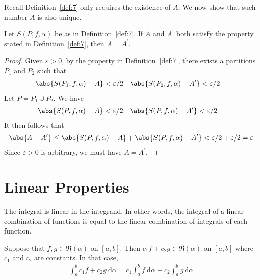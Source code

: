\documentclass[thmcnt=section, 12pt]{elegantbook}
\begin{document}

\par Recall Definition~\ref{def:7} only requires the existence of $A$. We now show that such number $A$ is also unique.

\begin{proposition} \label{pro:7}
    Let $S(P,f,\alpha)$ be as in Definition~\ref{def:7}. If $A$ and $A^\prime$ both satisfy the property stated in Definition~\ref{def:7}, then $A = A^\prime$.
\end{proposition}

\begin{proof}
    Given $\varepsilon > 0$, by the property in Definition~\ref{def:7}, there exists a partitions $P_1$ and $P_2$ such that  
    \begin{align*}
        \abs{S(P_1,f,\alpha) - A} &< \varepsilon / 2 &
        \abs{S(P_2,f,\alpha) - A^\prime} &< \varepsilon / 2
    \end{align*}
    Let $P = P_1 \cup P_2$. We have
    \begin{align*}
        \abs{S(P,f,\alpha) - A} &< \varepsilon / 2 &
        \abs{S(P,f,\alpha) - A^\prime} &< \varepsilon / 2
    \end{align*}
    It then follows that
    \begin{align*}
        \abs{A - A^\prime}
        \leq \abs{S(P,f,\alpha) - A} +
        \abs{S(P,f,\alpha) - A^\prime} 
        < \varepsilon / 2 + \varepsilon / 2
        = \varepsilon
    \end{align*}
    Since $\varepsilon > 0$ is arbitrary, we must have $A = A^\prime$.
\end{proof}


\section{Linear Properties}


\par The integral is linear in the integrand. In other words, the integral of a linear combination of functions is equal to the linear combination of integrals of each function.

\begin{theorem}
    Suppose that $f, g \in \mathfrak{R}(\alpha)$ on $[a,b]$. Then $c_1 f + c_2 g \in \mathfrak{R}(\alpha)$ on $[a,b]$ where $c_1$ and $c_2$ are constants. In that case, 
    \begin{align*}
        \int_a^b c_1 f + c_2 g \ \mathrm{d}\alpha
        = c_1 \int_a^b f \ \mathrm{d}\alpha
        + c_2 \int_a^b g \ \mathrm{d}\alpha
    \end{align*}
\end{theorem}
\end{document}
